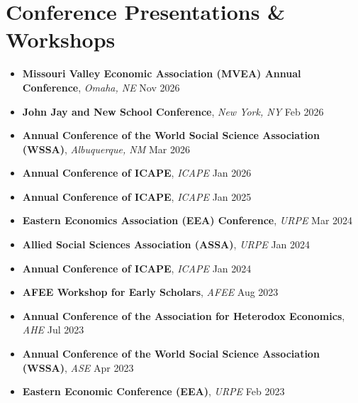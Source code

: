 \documentclass[letterpaper,11pt]{article}
\begin{document}
\section{Conference Presentations \& Workshops}
\vspace{3pt}
\begin{itemize}[leftmargin=0.15in, label={\textcolor{accentcolor}{\textbullet}}, itemsep=0pt]
  \item \small{\textbf{\color{textgray}Missouri Valley Economic Association (MVEA) Annual Conference}, \textit{\color{lightgray}Omaha, NE} \hfill \textcolor{accentcolor}{Nov 2026}}
  \item \small{\textbf{\color{textgray}John Jay and New School Conference}, \textit{\color{lightgray}New York, NY} \hfill \textcolor{accentcolor}{Feb 2026}}
  \item \small{\textbf{\color{textgray}Annual Conference of the World Social Science Association (WSSA)}, \textit{\color{lightgray}Albuquerque, NM} \hfill \textcolor{accentcolor}{Mar 2026}}
  \item \small{\textbf{\color{textgray}Annual Conference of ICAPE}, \textit{\color{lightgray}ICAPE} \hfill \textcolor{accentcolor}{Jan 2026}}
  \item \small{\textbf{\color{textgray}Annual Conference of ICAPE}, \textit{\color{lightgray}ICAPE} \hfill \textcolor{accentcolor}{Jan 2025}}
  \item \small{\textbf{\color{textgray}Eastern Economics Association (EEA) Conference}, \textit{\color{lightgray}URPE} \hfill \textcolor{accentcolor}{Mar 2024}}
  \item \small{\textbf{\color{textgray}Allied Social Sciences Association (ASSA)}, \textit{\color{lightgray}URPE} \hfill \textcolor{accentcolor}{Jan 2024}}
  \item \small{\textbf{\color{textgray}Annual Conference of ICAPE}, \textit{\color{lightgray}ICAPE} \hfill \textcolor{accentcolor}{Jan 2024}}
  \item \small{\textbf{\color{textgray}AFEE Workshop for Early Scholars}, \textit{\color{lightgray}AFEE} \hfill \textcolor{accentcolor}{Aug 2023}}
  \item \small{\textbf{\color{textgray}Annual Conference of the Association for Heterodox Economics}, \textit{\color{lightgray}AHE} \hfill \textcolor{accentcolor}{Jul 2023}}
  \item \small{\textbf{\color{textgray}Annual Conference of the World Social Science Association (WSSA)}, \textit{\color{lightgray}ASE} \hfill \textcolor{accentcolor}{Apr 2023}}
  \item \small{\textbf{\color{textgray}Eastern Economic Conference (EEA)}, \textit{\color{lightgray}URPE} \hfill \textcolor{accentcolor}{Feb 2023}}
\end{itemize}
\end{document}
